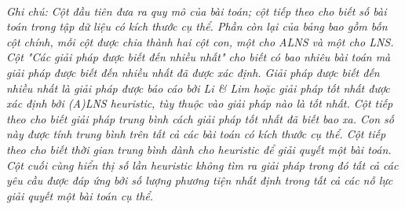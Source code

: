 \begin{table}[caption={Tóm tắt kết quả thu được từ các trường hợp của Li \& Lim (2001)}, label=tab:4.4]
     \\
        \justify
        \textit{Ghi chú: Cột đầu tiên đưa ra quy mô của bài toán; cột tiếp theo cho biết số bài toán trong tập dữ liệu có kích thước cụ thể. Phần còn lại của bảng bao gồm bốn cột chính, mỗi cột được chia thành hai cột con, một cho ALNS và một cho LNS. Cột "Các giải pháp được biết đến nhiều nhất" cho biết có bao nhiêu bài toán mà giải pháp được biết đến nhiều nhất đã được xác định. Giải pháp được biết đến nhiều nhất là giải pháp được báo cáo bởi Li \& Lim hoặc giải pháp tốt nhất được xác định bởi (A)LNS heuristic, tùy thuộc vào giải pháp nào là tốt nhất. Cột tiếp theo cho biết giải pháp trung bình cách giải pháp tốt nhất đã biết bao xa. Con số này được tính trung bình trên tất cả các bài toán có kích thước cụ thể. Cột tiếp theo cho biết thời gian trung bình dành cho heuristic để giải quyết một bài toán. Cột cuối cùng hiển thị số lần heuristic không tìm ra giải pháp trong đó tất cả các yêu cầu được đáp ứng bởi số lượng phương tiện nhất định trong tất cả các nỗ lực giải quyết một bài toán cụ thể.}
\end{table}


